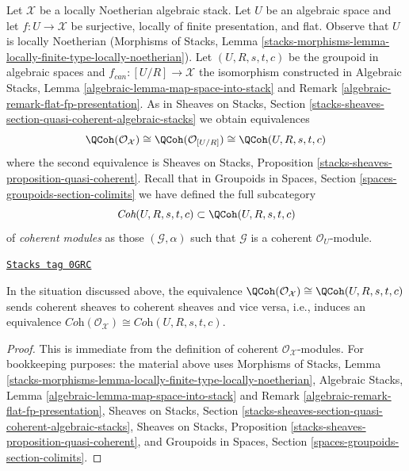 Let $\mathcal{X}$ be a locally Noetherian algebraic stack.
Let $U$ be an algebraic space and let $f : U \to \mathcal{X}$
be surjective, locally of finite presentation, and flat.
Observe that $U$ is locally Noetherian
(Morphisms of Stacks, Lemma
\ref{stacks-morphisms-lemma-locally-finite-type-locally-noetherian}).
Let $(U, R, s, t, c)$ be the groupoid in algebraic spaces
and $f_{can} : [U/R] \to \mathcal{X}$ the isomorphism
constructed in
Algebraic Stacks, Lemma \ref{algebraic-lemma-map-space-into-stack} and
Remark \ref{algebraic-remark-flat-fp-presentation}.
As in Sheaves on Stacks, Section
\ref{stacks-sheaves-section-quasi-coherent-algebraic-stacks}
we obtain equivalences
$$
\QCoh(\mathcal{O}_\mathcal{X})
\cong
\QCoh(\mathcal{O}_{[U/R]})
\cong
\QCoh(U, R, s, t, c)
$$
where the second equivalence is
Sheaves on Stacks, Proposition \ref{stacks-sheaves-proposition-quasi-coherent}.
Recall that in Groupoids in Spaces, Section
\ref{spaces-groupoids-section-colimits}
we have defined the full subcategory
$$
\textit{Coh}(U, R, s, t, c) \subset \QCoh(U, R, s, t, c)
$$
of {\it coherent modules} as those $(\mathcal{G}, \alpha)$ such that
$\mathcal{G}$ is a coherent $\mathcal{O}_U$-module.

\begin{lemma}
\label{stacks-cohomology-lemma-coherent-presentation}
\href{https://stacks.math.columbia.edu/tag/0GRC}{\texttt{Stacks tag 0GRC}}

In the situation discussed above, the equivalence
$\QCoh(\mathcal{O}_\mathcal{X}) \cong \QCoh(U, R, s, t, c)$
sends coherent sheaves to coherent sheaves and vice versa, i.e.,
induces an equivalence
$\textit{Coh}(\mathcal{O}_\mathcal{X}) \cong \textit{Coh}(U, R, s, t, c)$.
\end{lemma}

\begin{proof}
This is immediate from the definition of coherent
$\mathcal{O}_\mathcal{X}$-modules.
For bookkeeping purposes: the material above uses
Morphisms of Stacks, Lemma
\ref{stacks-morphisms-lemma-locally-finite-type-locally-noetherian},
Algebraic Stacks, Lemma \ref{algebraic-lemma-map-space-into-stack} and
Remark \ref{algebraic-remark-flat-fp-presentation},
Sheaves on Stacks, Section
\ref{stacks-sheaves-section-quasi-coherent-algebraic-stacks},
Sheaves on Stacks, Proposition \ref{stacks-sheaves-proposition-quasi-coherent},
and Groupoids in Spaces, Section
\ref{spaces-groupoids-section-colimits}.
\end{proof}

